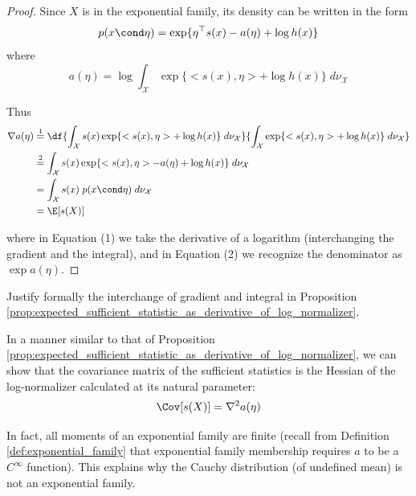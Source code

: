 \documentclass{article} %
\newcommand{\logNormalizerFunction}{a}
\newcommand{\sufficientStatsFunction}{s}
\newcommand{\carrierDensity}{h}
\newcommand{\naturalParam}{\eta}
\begin{document}
\begin{proof}

Since $X$ is in the exponential family, its density can be written in the form
 \[ p(x \cond \naturalParam) =  \exp \{ \naturalParam^\top \sufficientStatsFunction(x) - \logNormalizerFunction(\naturalParam) + \log \carrierDensity(x)\} \] 
where 
\[\logNormalizerFunction(\naturalParam) = \log \int_{\mathcal{X}} \exp \{ <\sufficientStatsFunction(x), \naturalParam> + \log \carrierDensity(x) \} \; d\nu_{\mathcal{X}} \] 

Thus
\begin{align*}
\nabla \logNormalizerFunction (\naturalParam) & \stackrel{1}{=}  \df{ \int_{\mathcal{X}} \sufficientStatsFunction(x)  \exp \{ <\sufficientStatsFunction(x), \naturalParam> + \log \carrierDensity(x) \} \; d\nu_{\mathcal{X}} }{\int_{\mathcal{X}} \exp \{ <\sufficientStatsFunction(x), \naturalParam> + \log \carrierDensity(x) \} \; d\nu_{\mathcal{X}} } \\
& \stackrel{2}{=} \int_{\mathcal{X}} \sufficientStatsFunction(x)  \exp \{ <\sufficientStatsFunction(x), \naturalParam> - \logNormalizerFunction(\naturalParam) + \log \carrierDensity(x) \} \; d\nu_{\mathcal{X}}  \\
& = \int_{\mathcal{X}} \sufficientStatsFunction(x)  \; p(x \cond \naturalParam) \; d\nu_{\mathcal{X}}  \\
&= \E[\sufficientStatsFunction(X)]
\end{align*}

where in  Equation (1) we take the derivative of a logarithm (interchanging the gradient and the integral), and in Equation (2) we recognize the denominator as $\exp \logNormalizerFunction(\naturalParam)$.	
\end{proof}



\begin{task}
Justify formally the interchange of gradient and integral in Proposition \ref{prop:expected_sufficient_statistic_as_derivative_of_log_normalizer}.	
\end{task}

\begin{remark}
In a manner similar to that of Proposition \ref{prop:expected_sufficient_statistic_as_derivative_of_log_normalizer}, we can show that the covariance matrix of the sufficient statistics is the Hessian of the log-normalizer calculated at its natural parameter:
\[ \Cov[\sufficientStatsFunction(X)] = \nabla^2 \logNormalizerFunction(\naturalParam) \]	

In fact, all moments of an exponential family are finite (recall from Definition \ref{def:exponential_family} that exponential family membership requires $a$ to be a $C^\infty$ function).  This explains why the Cauchy distribution (of undefined mean) is not an exponential family.
\label{rk:any_exponential_family_has_finite_moments}
\end{remark}
\end{document}
